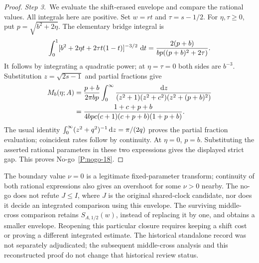 \begin{proof}
  \medskip
  \noindent\textit{Step 3.~}We evaluate the shift-erased envelope and compare
  the rational values.
  All integrals here are positive. Set $w=rt$ and $\tau=s-1/2$.
  For $\eta,\tau\ge0$, put $p=\sqrt{b^2+2\eta}$. The elementary bridge
  integral is
  \[
    \int_0^1[b^2+2\eta t+2\tau t(1-t)]^{-3/2}\,\,\mathrm{d} t
    =\frac{2(p+b)}{bp((p+b)^2+2\tau)}.
  \]
  It follows by integrating a quadratic power; at $\eta=\tau=0$ both sides
  are $b^{-3}$. Substitution $z=\sqrt{2s-1}$ and partial fractions give
  \begin{align*}
    M_b(\eta;A)&=\frac{p+b}{2\pi bp}
    \int_0^\infty\frac{\,\mathrm{d} z}
    {(z^2+1)(z^2+c^2)(z^2+(p+b)^2)}\\
    &=\frac{1+c+p+b}{4bp c(c+1)(c+p+b)(1+p+b)}.
  \end{align*}
  The usual identity $\int_0^\infty(z^2+q^2)^{-1}\,\mathrm{d} z=\pi/(2q)$
  proves the partial fraction evaluation; coincident rates follow by
  continuity. At $\eta=0$, $p=b$. Substituting the asserted rational
  parameters in these two expressions gives the displayed strict gap.
  This proves No-go~\ref{P:nogo-18}.
\end{proof}

The boundary value $\nu=0$ is a legitimate fixed-parameter transform;
continuity of both rational expressions also gives an overshoot for some
$\nu>0$ nearby. The no-go does not refute $J\le I$, where $J$ is the
original shared-clock candidate, nor does it decide an integrated
comparison using this envelope. The surviving middle-cross comparison
retains $S_{A,1/2}(w)$, instead of replacing it by one, and obtains a smaller
envelope. Reopening this particular closure requires keeping a shift cost
or proving a different integrated estimate. The historical standalone
record was not separately adjudicated; the subsequent
middle-cross analysis and this reconstructed proof do not change that
historical review status.
